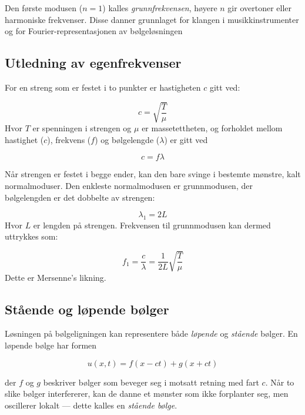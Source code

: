 Den første modusen ($n=1$) kalles \textit{grunnfrekvensen}, høyere $n$ gir overtoner eller harmoniske frekvenser.  
Disse danner grunnlaget for klangen i musikkinstrumenter og for Fourier-representasjonen av bølgeløsningen \parencite{physicsClassroomFundamental}

\subsection{Utledning av egenfrekvenser}
For en streng som er festet i to punkter er hastigheten $c$ gitt ved:

\begin{equation*}
    c = \sqrt{\frac{T}{\mu}}
\end{equation*}
Hvor $T$ er spenningen i strengen og $\mu$ er massetettheten, og forholdet mellom hastighet
($c$), frekvens ($f$) og bølgelengde ($\lambda$) er gitt ved

\begin{equation*}
    c = f \lambda
\end{equation*}  

Når strengen er festet i begge ender, kan den bare svinge i bestemte mønstre, kalt normalmoduser.
Den enkleste normalmodusen er grunnmodusen, der bølgelengden er det dobbelte av strengen:

\begin{equation*}
    \lambda_1 = 2L
\end{equation*}
Hvor $L$ er lengden på strengen.
Frekvensen til grunnmodusen kan dermed uttrykkes som:

\begin{equation*}
    f_1 = \frac{c}{\lambda} = \frac{1}{2L} \sqrt{\frac{T}{\mu}}
\end{equation*}
Dette er Mersenne's likning. \parencite{MersennesLaws}

\subsection{Stående og løpende bølger}

Løsningen på bølgeligningen kan representere både \textit{løpende} og \textit{stående} bølger.  
En løpende bølge har formen

\begin{equation*}
u(x,t) = f(x - ct) + g(x + ct)
\end{equation*}

der $f$ og $g$ beskriver bølger som beveger seg i motsatt retning med fart $c$.  
Når to slike bølger interfererer, kan de danne et mønster som ikke forplanter seg, men oscillerer lokalt — dette kalles en \textit{stående bølge}.  

